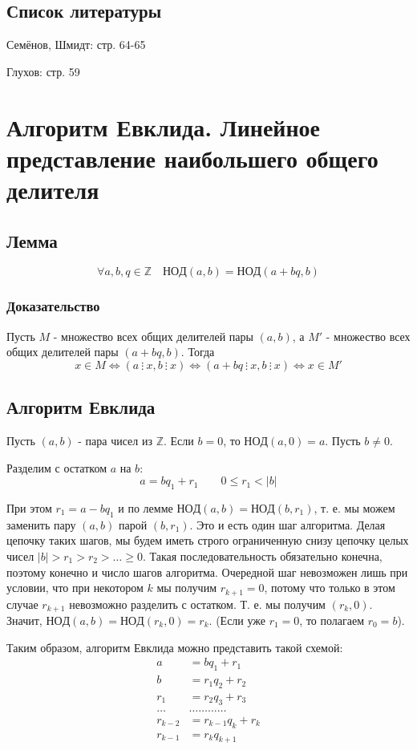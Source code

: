 \documentclass{article}
\newcommand{\cgcd}{\mathrm{НОД}}
\newcommand{\divs}{~\vdots~}
\begin{document}
\subsection*{Список литературы}
Семёнов, Шмидт: стр. 64-65

Глухов: стр. 59


\newpage
\section{Алгоритм Евклида. Линейное представление наибольшего общего делителя}
\subsection{Лемма}
\[\forall a, b, q \in \mathbb Z \quad \cgcd(a, b) = \cgcd(a + bq, b)\]
\subsubsection*{Доказательство}
Пусть $M$ - множество всех общих делителей пары $(a, b)$, а $M'$ - множество всех общих делителей пары $(a + bq, b)$. Тогда
\[x \in M \Leftrightarrow (a \divs x, b \divs x) \Leftrightarrow (a + bq \divs x, b \divs x) \Leftrightarrow x \in M'\]

\subsection{Алгоритм Евклида}
Пусть $(a, b)$ - пара чисел из $\mathbb Z$. Если $b = 0$, то $\cgcd(a, 0) = a$. Пусть $b \neq 0$.

Разделим с остатком $a$ на $b$:
\[a = bq_1 + r_1 \qquad 0 \leq r_1 < |b|\]

При этом $r_1 = a - bq_1$ и по лемме $\cgcd(a, b) = \cgcd(b, r_1)$, т. е. мы можем заменить пару $(a, b)$ парой $(b, r_1)$. Это и есть один шаг алгоритма. Делая цепочку таких шагов, мы будем иметь строго ограниченную снизу цепочку целых чисел ${|b| > r_1 > r_2 > \dots \geq 0}$. Такая последовательность обязательно конечна, поэтому конечно и число шагов алгоритма. Очередной шаг невозможен лишь при условии, что при некотором $k$ мы получим $r_{k+1} = 0$, потому что только в этом случае $r_{k+1}$ невозможно разделить с остатком. Т. е. мы получим $(r_k, 0)$. Значит, $\cgcd(a, b) = \cgcd(r_k, 0) = r_k$. (Если уже $r_1 = 0$, то полагаем $r_0 = b$).

Таким образом, алгоритм Евклида можно представить такой схемой:
\begin{align*}
a &= bq_1 + r_1		\\
b &= r_1q_2 + r_2	\\
r_1 &= r_2q_3 + r_3	\\
\dots & \dots \dots \dots \dots		\\
r_{k-2} &= r_{k-1}q_k + r_k	\\
r_{k-1} &= r_kq_{k+1}
\end{align*}
\end{document}
